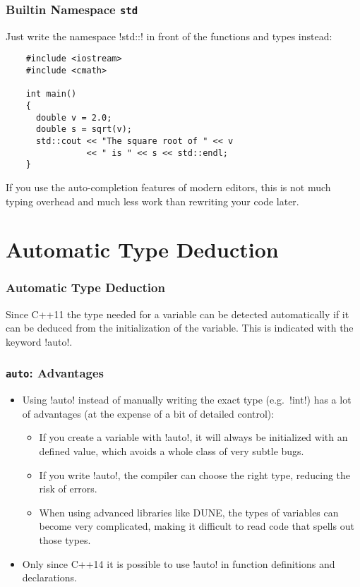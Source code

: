 \begin{frame}[fragile]
  \frametitle<presentation>{Builtin Namespace \texttt{std}}
Just write the namespace \inline!std::! in front of the functions and types instead:
  \begin{lstlisting}
    #include <iostream>
    #include <cmath>

    int main()
    {
      double v = 2.0;
      double s = sqrt(v);
      std::cout << "The square root of " << v
                << " is " << s << std::endl;
    }
  \end{lstlisting}
  If you use the auto-completion features of modern editors, this is not much typing overhead and much less work than rewriting your code later.
\end{frame}

\section{Automatic Type Deduction}

\begin{frame}
\frametitle<presentation>{Automatic Type Deduction}

Since C++11 the type needed for a variable can be detected automatically if it can be deduced from the initialization of the variable. This is indicated with the keyword \inline!auto!.



\end{frame}

\begin{frame}[fragile]
\frametitle{\texttt{auto}: Advantages}

\begin{itemize}
\item Using \inline!auto! instead of manually writing the exact type (e.g.~\inline!int!) has a lot of advantages (at the expense of a bit of detailed control):
\begin{itemize}
\item If you create a variable with \inline!auto!, it will always be initialized with an defined value, which avoids a whole class of very subtle bugs.
\item If you write \inline!auto!, the compiler can choose the right type, reducing the risk of errors.
\item When using advanced libraries like DUNE, the types of variables can become very complicated, making it difficult to read code that spells out those types.
\end{itemize}
\item Only since C++14 it is possible to use \inline!auto! in function definitions and declarations.
\end{itemize}

\end{frame}

